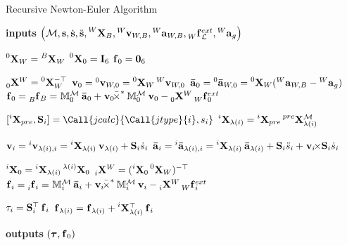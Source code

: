 \begin{algorithm}
\caption{Recursive Newton-Euler Algorithm}
\label{algo:rnea}

\begin{algorithmic}[1]
\small

\State \textbf{inputs} $\left(\mathcal{M}, \Shape, \Shaped, \Shapedd, \transvel[W]_B, \velsix[W]_{W,B}, \accsix[W]_{W,B}, \forcesix[W]^{ext}_\mathcal{L}, \accsix[W]_g \right)$

\State $\transvel[0]_{W} = \transvel[B]_W$
\State $\transvel[0]_{0} = \eye_6$
\State $\forcesix_0 = \zeros_6$

    \State $\transfor[0]^W = \transvel[0]_W^{-\top}$
    \State $\velsix_0 = \velsix[0]_{W,0} = \transvel[0]_{W} \velsix[W]_{W,0}$
    \State $\accsixproper_0 = \accsixproper[0]_{W,0} = \transvel[0]_{W} (\accsix[W]_{W,B} - \accsix[W]_g)$
    \State $\forcesix_0 = \forcesix[B]_B = \masssix_0^{\mathcal{M}} \accsixproper_0 + \crossforsix[\velsix_0] \masssix_0^{\mathcal{M}} \velsix_0 - \transfor[0]^W \forcesix[W]_0^{ext}$
\EndIf

        
    \State $[\transvel[i]_{pre}, \mathbf{S}_i] = \Call{jcalc}{\Call{jtype}{i}, s_i}$
    \State $\transvel[i]_{\lambda(i)} = \transvel[i]_{pre} \transvel[pre]_{\lambda(i)}^{\mathcal{M}}$
    
    \State $\velsix_i = \velsix[i]_{\lambda(i),i} = \transvel[i]_{\lambda(i)} \velsix_{\lambda(i)} + \mathbf{S}_i \dot{s}_i$
    \State $\accsixproper_i = \accsixproper[i]_{\lambda(i),i} = \transvel[i]_{\lambda(i)} \accsixproper_{\lambda(i)} + \mathbf{S}_i \ddot{s}_i + \crossvelsix[\velsix_i] \mathbf{S}_i \dot{s}_i$
    
    \State $\transvel[i]_0 = \transvel[i]_{\lambda(i)} \transvel[\lambda(i)]_0$
    \State $\transfor[i]^W = (\transvel[i]_0 \transvel[0]_W)^{-\top}$
    \State $\forcesix_i = \forcesix[i]_i = \masssix_i^{\mathcal{M}} \accsixproper_i + \crossforsix[\velsix_i] \masssix_i^{\mathcal{M}} \velsix_i - \transfor[i]^W \forcesix[W]_i^{ext}$
\EndFor

    \State $\tau_i = \mathbf{S}_i^\top \forcesix_i$
        \State $\forcesix_{\lambda(i)} = \forcesix_{\lambda(i)} + \transvel[i]_{\lambda(i)}^\top \forcesix_i$
    \EndIf
\EndFor

\State \textbf{outputs} $\left( \Torques, \forcesix_0 \right)$
%
\end{algorithmic}
\end{algorithm}

